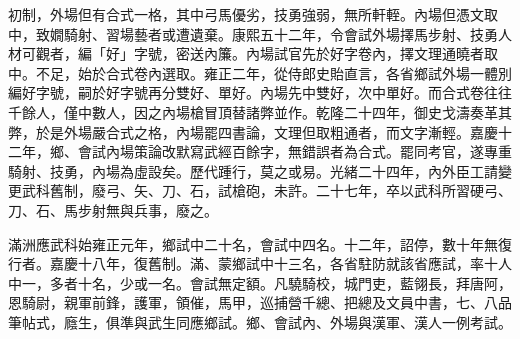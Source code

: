 \begin{pinyinscope}
初制，外場但有合式一格，其中弓馬優劣，技勇強弱，無所軒輊。內場但憑文取中，致嫺騎射、習場藝者或遭遺棄。康熙五十二年，令會試外場擇馬步射、技勇人材可觀者，編「好」字號，密送內簾。內場試官先於好字卷內，擇文理通曉者取中。不足，始於合式卷內選取。雍正二年，從侍郎史貽直言，各省鄉試外場一體別編好字號，嗣於好字號再分雙好、單好。內場先中雙好，次中單好。而合式卷往往千餘人，僅中數人，因之內場槍冒頂替諸弊並作。乾隆二十四年，御史戈濤奏革其弊，於是外場嚴合式之格，內場罷四書論，文理但取粗通者，而文字漸輕。嘉慶十二年，鄉、會試內場策論改默寫武經百餘字，無錯誤者為合式。罷同考官，遂專重騎射、技勇，內場為虛設矣。歷代踵行，莫之或易。光緒二十四年，內外臣工請變更武科舊制，廢弓、矢、刀、石，試槍砲，未許。二十七年，卒以武科所習硬弓、刀、石、馬步射無與兵事，廢之。

滿洲應武科始雍正元年，鄉試中二十名，會試中四名。十二年，詔停，數十年無復行者。嘉慶十八年，復舊制。滿、蒙鄉試中十三名，各省駐防就該省應試，率十人中一，多者十名，少或一名。會試無定額。凡驍騎校，城門吏，藍翎長，拜唐阿，恩騎尉，親軍前鋒，護軍，領催，馬甲，巡捕營千總、把總及文員中書，七、八品筆帖式，廕生，俱準與武生同應鄉試。鄉、會試內、外場與漢軍、漢人一例考試。


\end{pinyinscope}